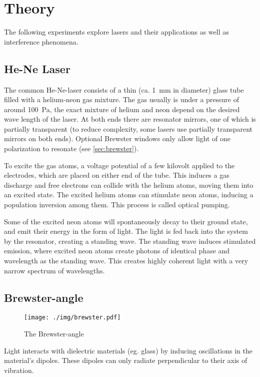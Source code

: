 \chapter{Theory}
The following experiments explore lasers and their applications as well as interference phenomena.

\section{He-Ne Laser}
The common He-Ne-laser consists of a thin (ca. \SI{1}{\milli\meter} in diameter) glass tube filled with a helium-neon gas mixture.
The gas usually is under a pressure of around \SI{100}{\pascal}, the exact mixture of helium and neon depend on the desired wave length of the laser.
At both ends there are resonator mirrors, one of which is partially transparent (to reduce complexity, some lasers use partially transparent mirrors on both ends).
Optional Brewster windows only allow light of one polarization to resonate (see \autoref{sec:brewster}).

To excite the gas atoms, a voltage potential of a few kilovolt applied to the electrodes, which are placed on either end of the tube.
This induces a gas discharge and free electrons can collide with the helium atoms, moving them into an excited state.
The excited helium atoms can stimulate neon atoms, inducing a population inversion among them.
This process is called optical pumping.

Some of the excited neon atoms will spontaneously decay to their ground state, and emit their energy in the form of light.
The light is fed back into the system by the resonator, creating a standing wave.
The standing wave induces stimulated emission, where excited neon atoms create photons of identical phase and wavelength as the standing wave.
This creates highly coherent light with a very narrow spectrum of wavelengths.

\section{Brewster-angle}\label{sec:brewster}

\begin{figure}[tb]
	\centering
	\texttt{[image: ./img/brewster.pdf]}
	\caption[Brewster-angle]{The Brewster-angle}
\end{figure}

Light interacts with dielectric materials (eg. glass) by inducing oscillations in the material's dipoles.
These dipoles can only radiate perpendicular to their axis of vibration.

